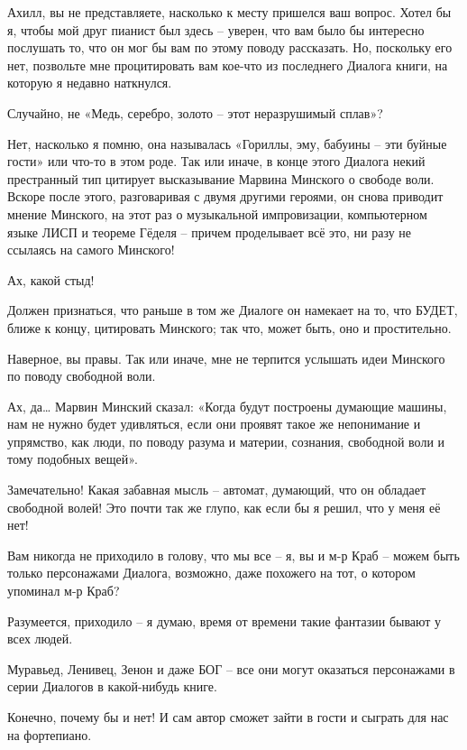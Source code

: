\documentclass[../main.tex]{subfiles}
\begin{document}
\begin{dialogue}
 Ахилл, вы не представляете, насколько к месту пришелся ваш вопрос. Хотел бы я, чтобы мой друг пианист был здесь \--- уверен, что вам было бы интересно послушать то, что он мог бы вам по этому поводу рассказать. Но, поскольку его нет, позвольте мне процитировать вам кое-что из последнего Диалога книги, на которую я недавно наткнулся.

 Случайно, не «Медь, серебро, золото \--- этот неразрушимый сплав»?

 Нет, насколько я помню, она называлась «Гориллы, эму, бабуины \--- эти буйные гости» или что-то в этом роде. Так или иначе, в конце этого Диалога некий престранный тип цитирует высказывание Марвина Минского о свободе воли. Вскоре после этого, разговаривая с двумя другими героями, он снова приводит мнение Минского, на этот раз о музыкальной импровизации, компьютерном языке ЛИСП и теореме Гёделя \--- причем проделывает всё это, ни разу не ссылаясь на самого Минского!

 Ах, какой стыд!

 Должен признаться, что раньше в том же Диалоге он намекает на то, что БУДЕТ, ближе к концу, цитировать Минского; так что, может быть, оно и простительно.

 Наверное, вы правы. Так или иначе, мне не терпится услышать идеи Минского по поводу свободной воли.

 Ах, да\ldots{} Марвин Минский сказал: «Когда будут построены думающие машины, нам не нужно будет удивляться, если они проявят такое же непонимание и упрямство, как люди, по поводу разума и материи, сознания, свободной воли и тому подобных вещей».

 Замечательно! Какая забавная мысль \--- автомат, думающий, что он обладает свободной волей! Это почти так же глупо, как если бы я решил, что у меня её нет!

 Вам никогда не приходило в голову, что мы все \--- я, вы и м-р Краб \--- можем быть только персонажами Диалога, возможно, даже похожего на тот, о котором упоминал м-р Краб?

 Разумеется, приходило \--- я думаю, время от времени такие фантазии бывают у всех людей.

 Муравьед, Ленивец, Зенон и даже БОГ \--- все они могут оказаться персонажами в серии Диалогов в какой-нибудь книге.

 Конечно, почему бы и нет! И сам автор сможет зайти в гости и сыграть для нас на фортепиано.


\end{dialogue}
\end{document}
